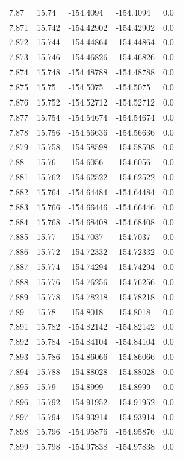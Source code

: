 \begin{tabular}{lllll}
7.87 & 15.74 & -154.4094 & -154.4094 & 0.0 \\
7.871 & 15.742 & -154.42902 & -154.42902 & 0.0 \\
7.872 & 15.744 & -154.44864 & -154.44864 & 0.0 \\
7.873 & 15.746 & -154.46826 & -154.46826 & 0.0 \\
7.874 & 15.748 & -154.48788 & -154.48788 & 0.0 \\
7.875 & 15.75 & -154.5075 & -154.5075 & 0.0 \\
7.876 & 15.752 & -154.52712 & -154.52712 & 0.0 \\
7.877 & 15.754 & -154.54674 & -154.54674 & 0.0 \\
7.878 & 15.756 & -154.56636 & -154.56636 & 0.0 \\
7.879 & 15.758 & -154.58598 & -154.58598 & 0.0 \\
7.88 & 15.76 & -154.6056 & -154.6056 & 0.0 \\
7.881 & 15.762 & -154.62522 & -154.62522 & 0.0 \\
7.882 & 15.764 & -154.64484 & -154.64484 & 0.0 \\
7.883 & 15.766 & -154.66446 & -154.66446 & 0.0 \\
7.884 & 15.768 & -154.68408 & -154.68408 & 0.0 \\
7.885 & 15.77 & -154.7037 & -154.7037 & 0.0 \\
7.886 & 15.772 & -154.72332 & -154.72332 & 0.0 \\
7.887 & 15.774 & -154.74294 & -154.74294 & 0.0 \\
7.888 & 15.776 & -154.76256 & -154.76256 & 0.0 \\
7.889 & 15.778 & -154.78218 & -154.78218 & 0.0 \\
7.89 & 15.78 & -154.8018 & -154.8018 & 0.0 \\
7.891 & 15.782 & -154.82142 & -154.82142 & 0.0 \\
7.892 & 15.784 & -154.84104 & -154.84104 & 0.0 \\
7.893 & 15.786 & -154.86066 & -154.86066 & 0.0 \\
7.894 & 15.788 & -154.88028 & -154.88028 & 0.0 \\
7.895 & 15.79 & -154.8999 & -154.8999 & 0.0 \\
7.896 & 15.792 & -154.91952 & -154.91952 & 0.0 \\
7.897 & 15.794 & -154.93914 & -154.93914 & 0.0 \\
7.898 & 15.796 & -154.95876 & -154.95876 & 0.0 \\
7.899 & 15.798 & -154.97838 & -154.97838 & 0.0 \\

\end{tabular}
